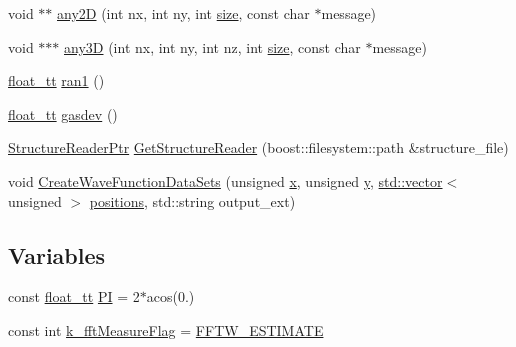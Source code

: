 \begin{DoxyCompactItemize}
\item 
void $\ast$$\ast$ \hyperlink{namespace_q_s_t_e_m_a19124ce08fd439d9c842c574c4af9c10}{any2\-D} (int nx, int ny, int \hyperlink{qmb_8m_a34efcbeb95e7c3e7e0050034d30c01cd}{size}, const char $\ast$message)
\item 
void $\ast$$\ast$$\ast$ \hyperlink{namespace_q_s_t_e_m_a4ebc8e8092c2018bbe2ac4e5d0f1a55b}{any3\-D} (int nx, int ny, int nz, int \hyperlink{qmb_8m_a34efcbeb95e7c3e7e0050034d30c01cd}{size}, const char $\ast$message)
\item 
\hyperlink{namespace_q_s_t_e_m_a915d7caa497280d9f927c4ce8d330e47}{float\-\_\-tt} \hyperlink{namespace_q_s_t_e_m_a3bdee418130076e4b82c8afb597b2f03}{ran1} ()
\item 
\hyperlink{namespace_q_s_t_e_m_a915d7caa497280d9f927c4ce8d330e47}{float\-\_\-tt} \hyperlink{namespace_q_s_t_e_m_a5e13b8cafb6a8f18aaf6603dc9cc8584}{gasdev} ()
\item 
\hyperlink{namespace_q_s_t_e_m_a3496fb9b2de0f3b3350f9b0d5206bc75}{Structure\-Reader\-Ptr} \hyperlink{namespace_q_s_t_e_m_a5bff3e0346b1ca9e58f1b37c0a0c9b9a}{Get\-Structure\-Reader} (boost\-::filesystem\-::path \&structure\-\_\-file)
\item 
void \hyperlink{namespace_q_s_t_e_m_a7c5a7f91e9c031aa75053ad833e9e578}{Create\-Wave\-Function\-Data\-Sets} (unsigned \hyperlink{_read_d_m3___matlab_8m_a9336ebf25087d91c818ee6e9ec29f8c1}{x}, unsigned \hyperlink{qmb_8m_a2fb1c5cf58867b5bbc9a1b145a86f3a0}{y}, \hyperlink{qmb_8m_af54b69a32590de218622e869b06b47b3}{std\-::vector}$<$ unsigned $>$ \hyperlink{qmb_8m_a923d61728dac7c6dff07427a901c9ba9}{positions}, std\-::string output\-\_\-ext)
\end{DoxyCompactItemize}
\subsection*{Variables}
\begin{DoxyCompactItemize}
\item 
const \hyperlink{namespace_q_s_t_e_m_a915d7caa497280d9f927c4ce8d330e47}{float\-\_\-tt} \hyperlink{namespace_q_s_t_e_m_a78cee406c660e4fe36e7ab36e34f1dec}{P\-I} = 2$\ast$acos(0.)
\item 
const int \hyperlink{namespace_q_s_t_e_m_a0032f41cd55b94be17d3c9dda2fc9012}{k\-\_\-fft\-Measure\-Flag} = \hyperlink{_g_u_i___matlab_2fftw3_8h_afb7257abc054cd5874b3c011437cc801}{F\-F\-T\-W\-\_\-\-E\-S\-T\-I\-M\-A\-T\-E}
\end{DoxyCompactItemize}


